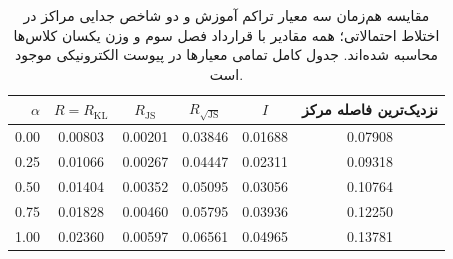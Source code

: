 \begin{table}[htbp]
\centering\small
\caption{مقایسه هم‌زمان سه معیار تراکم آموزش و دو شاخص جدایی مراکز در اختلاط احتمالاتی؛ همه مقادیر با قرارداد فصل سوم و وزن یکسان کلاس‌ها محاسبه شده‌اند. جدول کامل تمامی معیارها در پیوست الکترونیکی موجود است.}
\label{tab:ch4-guided-mixture-complete-compactness}
\begin{tabular}{rccccc}\hline
$\alpha$ & $R=R_{\mathrm{KL}}$ & $R_{\mathrm{JS}}$ & $R_{\sqrt{\mathrm{JS}}}$ & $I$ & نزدیک‌ترین فاصله مرکز\\\hline
0.00 & 0.00803 & 0.00201 & 0.03846 & 0.01688 & 0.07908\\
0.25 & 0.01066 & 0.00267 & 0.04447 & 0.02311 & 0.09318\\
0.50 & 0.01404 & 0.00352 & 0.05095 & 0.03056 & 0.10764\\
0.75 & 0.01828 & 0.00460 & 0.05795 & 0.03936 & 0.12250\\
1.00 & 0.02360 & 0.00597 & 0.06561 & 0.04965 & 0.13781\\
\hline
\end{tabular}
\end{table}

